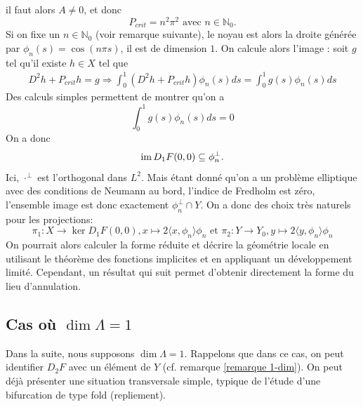\documentclass[memoire.tex]{subfiles}
\begin{document}
\begin{exemple}
    il faut alors $A\neq0$, et donc
    \begin{equation}\label{modes}
        P_{crit}=n^2\pi^2\text{ avec } n\in\mathbb{N}_{0}.
    \end{equation}
    Si on fixe un $n\in\mathbb{N}_0$ (voir remarque suivante), le noyau est alors la droite générée par $\phi_{n}(s)=\cos(n\pi s)$, il est de dimension $1$.
    On calcule alors l'image : soit $g$ tel qu'il existe $h\in X$ tel que 
    \begin{align*}
        &D^2 h + P_{crit}h=g \Rightarrow \int_{0}^1 (D^2 h + P_{crit}h)\phi_n(s)ds=\int_{0}^1g(s)\phi_n(s)ds
        &
    \end{align*}
    Des calculs simples permettent de montrer qu'on a 
    \begin{equation*}
        \int_{0}^{1} g(s)\phi_n(s)ds=0
    \end{equation*}
    On a donc
    \begin{equation*}
        \operatorname{im} D_1 F(0,0)\subseteq \phi_n ^{\perp}.
    \end{equation*}
    Ici, $\cdot^\perp$ est l'orthogonal dans $L^2$. Mais étant donné qu'on a un problème elliptique avec des conditions de Neumann au bord, l'indice de Fredholm est zéro, l'ensemble image est donc exactement $\phi_n^{\perp}\cap Y$. On a donc des choix très naturels pour les projections: 
    \begin{equation*}
        \pi_1: X\rightarrow \ker D_1 F(0,0), x\mapsto 2\langle x,\phi_n\rangle\phi_n\text{ et } \pi_2: Y\rightarrow Y_0, y\mapsto 2\langle y,\phi_n \rangle\phi_n
    \end{equation*}
    On pourrait alors calculer la forme réduite et décrire la géométrie locale en utilisant le théorème des fonctions implicites et en appliquant un développement limité. Cependant, un résultat qui suit permet d'obtenir directement la forme du lieu d'annulation.
\end{exemple}



\subsection{Cas où $\dim \Lambda=1$}\label{section-dim-1}
Dans la suite, nous supposons $\dim \Lambda = 1$. Rappelons que dans ce cas, on peut identifier $D_2F$ avec un élément de $Y$ (cf. remarque \ref{remarque 1-dim}).
On peut déjà présenter une situation transversale simple, typique de l'étude d'une bifurcation de type fold (repliement).
\end{document}
